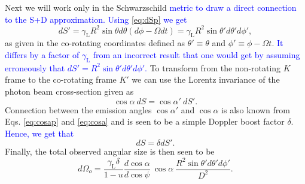 \documentclass{aa}
\newcommand{\be}{\begin{equation}}
\newcommand{\ee}{\end{equation}}
\newcommand{\refe}[1]{\textcolor{blue}{{#1}}}
\newcommand{\refedel}[1]{}
\newcommand{\sch}{Schwarzschild }
\newcommand{\Ob}{\ensuremath{\hat{\Omega}}}
\newcommand{\lgamma}{\gamma_{\text{L}}}
\begin{document}
Next we will work only in the \sch \refe{metric to draw a direct connection to the S+D approximation.}\refedel{and consider only terms up to $\mathcal{O}(\Ob^2)$.}
\refe{Using \eqref{eq:dSp} we get}
\be\label{eq:dS_subs}
dS' = \lgamma R^2 \sin\theta d\theta (d\phi - \Omega dt) = \lgamma R^2 \sin\theta' d\theta' d\phi',
\ee
as given in the co-rotating coordinates defined as $\theta' \equiv \theta$ and $\phi' \equiv \phi - \Omega t$.
\refe{It differs by a factor of $\lgamma$ from an incorrect result that one would get by assuming erroneously that $dS' = R^2 \sin\theta' d\theta' d\phi'$.}
To transform from the non-rotating $K$ frame to the co-rotating frame $K'$ we can use the Lorentz invariance of the photon beam cross-section given as \citep{Terrell60, LB85}
\be
\cos\alpha ~dS = \cos\alpha' ~dS'.
\ee
Connection between the emission angles $\cos\alpha'$ and $\cos\alpha$ is also known from Eqs. \eqref{eq:cosap} and \eqref{eq:cosa} and is seen to be a simple Doppler boost factor $\delta$.
\refe{Hence, we get that}
\be\label{eq:dSisdSp}
dS = \delta dS'.
\ee
Finally, the total observed angular size is then seen to be 
\be
d\Omega_o = \frac{\lgamma \delta}{1-u} \frac{d \cos\alpha}{d \cos\psi} ~\cos\alpha ~ \frac{R^2 \sin\theta' d\theta' d\phi'}{D^2}.
\ee
\end{document}
